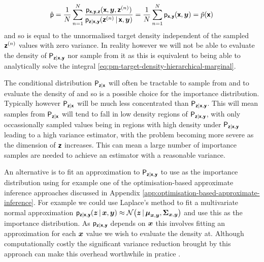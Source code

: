 \begin{equation}
  \hat{\mathsf{p}} = 
  \frac{1}{N} \sum_{n=1}^N 
  \frac
    {\mathsf{p}_{\boldsymbol{\mathsf{x}},\boldsymbol{\mathsf{y}},\boldsymbol{\mathsf{z}}}(\boldsymbol{\mathsf{x}},\boldsymbol{y},\boldsymbol{\mathsf{z}}^{(n)})}
    {\mathsf{p}_{\boldsymbol{\mathsf{z}}|\boldsymbol{\mathsf{x}},\boldsymbol{\mathsf{y}}}(\boldsymbol{\mathsf{z}}^{(n)}\operatorname{|}\boldsymbol{\mathsf{x}},\boldsymbol{y})} =
  \frac{1}{N} \sum_{n=1}^N \mathsf{p}_{\boldsymbol{\mathsf{x}},\boldsymbol{\mathsf{y}}}(\boldsymbol{\mathsf{x}},\boldsymbol{y}) = \tilde{p}(\boldsymbol{\mathsf{x}})  
\end{equation}
and so is equal to the unnormalised target density independent of the sampled $\boldsymbol{\mathsf{z}}^{(n)}$ values with zero variance. In reality however we will not be able to evaluate the density of $\mathsf{P}_{\boldsymbol{\mathsf{z}}|\boldsymbol{\mathsf{x}},\boldsymbol{\mathsf{y}}}$ nor sample from it as this is equivalent to being able to analytically solve the integral \eqref{eq:pm-target-density-hierarchical-marginal}.

The conditional distribution $\mathsf{P}_{\boldsymbol{\mathsf{z}}|\boldsymbol{\mathsf{x}}}$ will often be tractable to sample from and to evaluate the density of and so is a possible choice for the importance distribution. Typically however $\mathsf{P}_{\boldsymbol{\mathsf{z}}|\boldsymbol{\mathsf{x}}}$ will be much less concentrated than $\mathsf{P}_{\boldsymbol{\mathsf{z}}|\boldsymbol{\mathsf{x}},\boldsymbol{\mathsf{y}}}$. This will mean samples from $\mathsf{P}_{\boldsymbol{\mathsf{z}}|\boldsymbol{\mathsf{x}}}$ will tend to fall in low density regions of $\mathsf{P}_{\boldsymbol{\mathsf{z}}|\boldsymbol{\mathsf{x}},\boldsymbol{\mathsf{y}}}$, with only occassionally sampled values being in regions with high density under $\mathsf{P}_{\boldsymbol{\mathsf{z}}|\boldsymbol{\mathsf{x}},\boldsymbol{\mathsf{y}}}$ leading to a high variance estimator, with the problem becoming more severe as the dimension of $\boldsymbol{\mathsf{z}}$ increases. This can mean a large number of importance samples are needed to achieve an estimator with a reasonable variance.

An alternative is to fit an approximation to $\mathsf{P}_{\boldsymbol{\mathsf{z}}|\boldsymbol{\mathsf{x}},\boldsymbol{\mathsf{y}}}$ to use as the importance distribution using for example one of the optimisation-based approximate inference approaches discussed in Appendix \ref{app:optimisation-based-approximate-inference}. For example we could use Laplace's method to fit a multivariate normal approximation $\pden{\rvct{z}|\rvct{x},\rvct{y}}(\vct{z}\gvn\vct{x},\vct{y}) \approx \nrm{\vct{z} \gvn \vct{\mu}_{\vct{x},\vct{y}},\mtx{\Sigma}_{\vct{x},\vct{y}}}$ and use this as the importance distribution. As $\mathsf{p}_{\boldsymbol{\mathsf{z}}|\boldsymbol{\mathsf{x}},\boldsymbol{\mathsf{y}}}$ depends on $\boldsymbol{x}$ this involves fitting an approximation for each $\boldsymbol{x}$ value we wish to evaluate the density at. Although computationally costly the significant variance reduction brought by this approach can make this overhead worthwhile in pratice \citep{filippone2014pseudo}.

